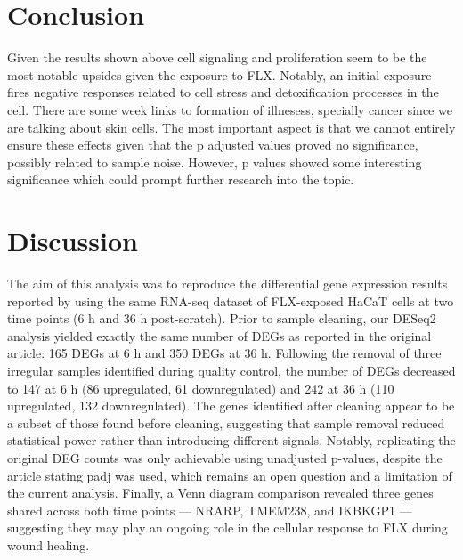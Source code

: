 \section{Conclusion}\label{conclusion}

Given the results shown above cell signaling and proliferation seem to
be the most notable upsides given the exposure to FLX. Notably, an
initial exposure fires negative responses related to cell stress and
detoxification processes in the cell. There are some week links to
formation of illnesess, specially cancer since we are talking about skin
cells. The most important aspect is that we cannot entirely ensure these
effects given that the p adjusted values proved no significance,
possibly related to sample noise. However, p values showed some
interesting significance which could prompt further research into the
topic.

\section{Discussion}\label{discussion}

The aim of this analysis was to reproduce the differential gene
expression results reported by \citep{rodriguez:2024} using the same
RNA-seq dataset of FLX-exposed HaCaT cells at two time points (6 h and
36 h post-scratch). Prior to sample cleaning, our DESeq2 analysis
yielded exactly the same number of DEGs as reported in the original
article: 165 DEGs at 6 h and 350 DEGs at 36 h. Following the removal of
three irregular samples identified during quality control, the number of
DEGs decreased to 147 at 6 h (86 upregulated, 61 downregulated) and 242
at 36 h (110 upregulated, 132 downregulated). The genes identified after
cleaning appear to be a subset of those found before cleaning,
suggesting that sample removal reduced statistical power rather than
introducing different signals. Notably, replicating the original DEG
counts was only achievable using unadjusted p-values, despite the
article stating padj was used, which remains an open question and a
limitation of the current analysis. Finally, a Venn diagram comparison
revealed three genes shared across both time points --- NRARP, TMEM238,
and IKBKGP1 --- suggesting they may play an ongoing role in the cellular
response to FLX during wound healing.




\address{%
Roa Hanoun\\
Hanze University of Applied Sciences\\%
\\
%
%
%
\href{mailto:rjm.hanoun@st.hanze.nl}{\nolinkurl{rjm.hanoun@st.hanze.nl}}%
}

\address{%
Jero Eyras\\
Hanze University of Applied Sciences\\%
\\
%
%
%
\href{mailto:j.eyras.jimenez@st.hanze.nl}{\nolinkurl{j.eyras.jimenez@st.hanze.nl}}%
}
